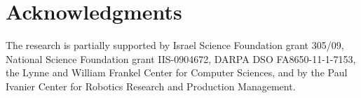 \section*{Acknowledgments}

The research is partially supported by Israel Science Foundation grant 305/09,
National Science Foundation grant IIS-0904672,
DARPA DSO FA8650-11-1-7153,
the Lynne and William Frankel Center for Computer Sciences,
and by the Paul Ivanier Center for Robotics Research and Production Management.